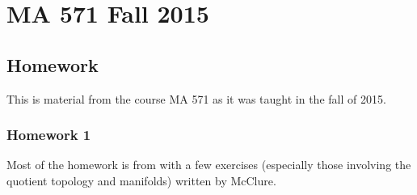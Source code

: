 \chapter{MA 571 Fall 2015}
\thispagestyle{empty}
\bigskip
\section{Homework}
This is material from the course MA 571 as it was taught in the fall of
2015.
\subsection{Homework 1}
Most of the homework is from \cite{munkres} with a few exercises
(especially those involving the quotient topology and manifolds) written by
McClure.

